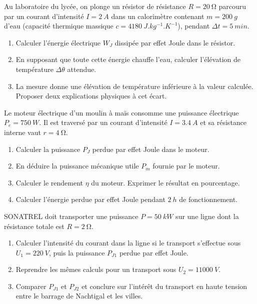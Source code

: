 \documentclass[11pt]{article}
\begin{document}
\begin{exercice}
Au laboratoire du lycée, on plonge un résistor de résistance $R = \SI{20}{\ohm}$ parcouru par un courant d'intensité $I = \SI{2}{A}$ dans un calorimètre contenant $m = \SI{200}{g}$ d'eau (capacité thermique massique $c = \SI{4180}{J.kg^{-1}.K^{-1}}$), pendant $\Delta t = \SI{5}{min}$.
\begin{enumerate}
\item Calculer l'énergie électrique $W_J$ dissipée par effet Joule dans le résistor.
\item En supposant que toute cette énergie chauffe l'eau, calculer l'élévation de température $\Delta\theta$ attendue.
\item La mesure donne une élévation de température inférieure à la valeur calculée. Proposer deux explications physiques à cet écart.
\end{enumerate}
\end{exercice}

\begin{exercice}
Le moteur électrique d'un moulin à maïs consomme une puissance électrique $P_e = \SI{750}{W}$. Il est traversé par un courant d'intensité $I = \SI{3,4}{A}$ et sa résistance interne vaut $r = \SI{4}{\ohm}$.
\begin{enumerate}
\item Calculer la puissance $P_J$ perdue par effet Joule dans le moteur.
\item En déduire la puissance mécanique utile $P_m$ fournie par le moteur.
\item Calculer le rendement $\eta$ du moteur. Exprimer le résultat en pourcentage.
\item Calculer l'énergie perdue par effet Joule pendant $\SI{2}{h}$ de fonctionnement.
\end{enumerate}
\end{exercice}

\begin{exercice}
SONATREL doit transporter une puissance $P = \SI{50}{kW}$ sur une ligne dont la résistance totale est $R = \SI{2}{\ohm}$.
\begin{enumerate}
\item Calculer l'intensité du courant dans la ligne si le transport s'effectue sous $U_1 = \SI{220}{V}$, puis la puissance $P_{J1}$ perdue par effet Joule.
\item Reprendre les mêmes calculs pour un transport sous $U_2 = \SI{11000}{V}$.
\item Comparer $P_{J1}$ et $P_{J2}$ et conclure sur l'intérêt du transport en haute tension entre le barrage de Nachtigal et les villes.
\end{enumerate}
\end{exercice}
\end{document}
